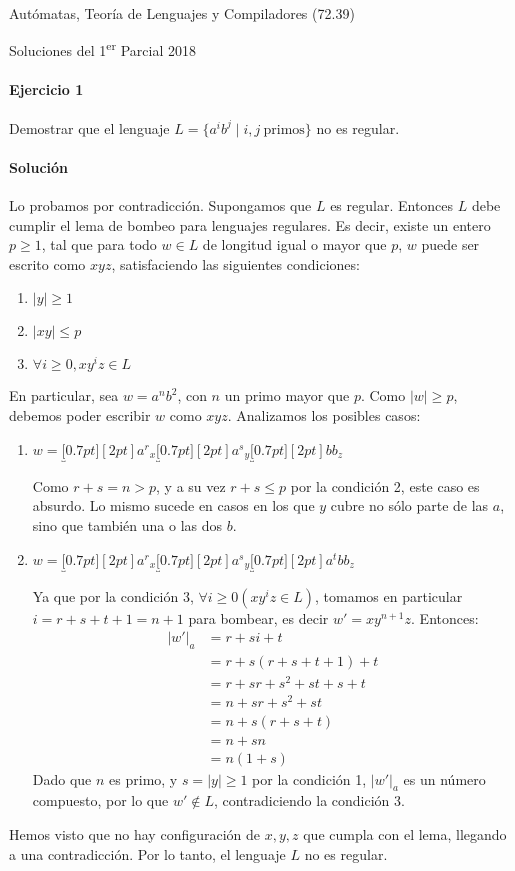 \documentclass[spanish]{article}
\newcommand{\smallunderbracket}[1]{\underbracket[0.7pt][2pt]{#1}}
\begin{document}
\centerline{\LARGE{Autómatas, Teoría de Lenguajes y Compiladores (72.39)}}
\vspace{6pt}
\centerline{\Large{Soluciones del 1\textsuperscript{er} Parcial 2018}}
\paragraph{Ejercicio 1} Demostrar que el lenguaje $L = \{a^i b^j\mid i, j~\text{primos}\}$ no es regular.

\paragraph{Solución} Lo probamos por contradicción. Supongamos que $L$ es regular. Entonces $L$ debe cumplir el lema de bombeo para
lenguajes regulares. Es decir, existe un entero $p \geq 1$, tal que para todo
$w \in L$ de longitud igual o mayor que $p$, $w$ puede ser escrito como $xyz$,
satisfaciendo las siguientes condiciones:
\begin{enumerate}
  \item $|y| \geq 1$
  \item $|xy| \leq p$
  \item $\forall i\geq 0, xy^iz \in L$
\end{enumerate}

En particular, sea $w = a^nb^2$, con $n$ un primo mayor que $p$. Como $|w|\geq p$,
debemos poder escribir $w$ como $xyz$. Analizamos los posibles casos:
\begin{enumerate}
  \item $w = \smallunderbracket{a^r}_x \smallunderbracket{a^s}_y
    \smallunderbracket{bb}_z$

    Como $r + s = n > p$, y a su vez $r + s \leq p$ por la condición 2, este caso es
    absurdo. Lo mismo sucede en casos en los que $y$ cubre no sólo parte de las
    $a$, sino que también una o las dos $b$.

  \item $w = \smallunderbracket{a^r}_x \smallunderbracket{a^s}_y \smallunderbracket{a^tbb}_z$

    Ya que por la condición 3, $\forall i\geq 0(xy^iz \in L)$, tomamos en
    particular $i = r + s + t + 1 = n + 1$ para bombear, es decir $w' =
    xy^{n+1}z$. Entonces:
\begin{align*}
  |w'|_a & = r + si + t\\
        & = r + s(r + s + t + 1) + t\\
        & = r + sr + s^2 + st + s + t\\
        & = n + sr + s^2 + st\\
        & = n + s(r + s + t)\\
        & = n + sn\\
        & = n(1 + s)
\end{align*}
Dado que $n$ es primo, y $s = |y| \geq 1$ por la condición 1, $|w'|_a$ es un número
compuesto, por lo que $w' \not\in L$, contradiciendo la condición 3.
\end{enumerate}
Hemos visto que no hay configuración de $x, y, z$ que cumpla con el lema,
llegando a una contradicción. Por lo tanto, el lenguaje $L$ no es regular.
\end{document}
